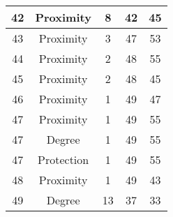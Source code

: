 \documentclass[results.tex]{subfiles}
\begin{document}
\begin{center}
\begin{tabular}{| c || c | c | c | c |}
            \hline
            42                      & Proximity                    & 8                      & 42                      & 45                   \\
            \hline
            43                      & Proximity                    & 3                      & 47                      & 53                   \\
            \hline
            44                      & Proximity                    & 2                      & 48                      & 55                   \\
            \hline
            45                      & Proximity                    & 2                      & 48                      & 45                   \\
            \hline
            46                      & Proximity                    & 1                      & 49                      & 47                   \\
            \hline
            47                      & Proximity                    & 1                      & 49                      & 55                   \\
            \hline
            47                      & Degree                       & 1                      & 49                      & 55                   \\
            \hline
            47                      & Protection                   & 1                      & 49                      & 55                   \\
            \hline
            48                      & Proximity                    & 1                      & 49                      & 43                   \\
            \hline
            49                      & Degree                       & 13                     & 37                      & 33                   \\
            \hline
        \end{tabular}
    \end{center}
\end{document}
